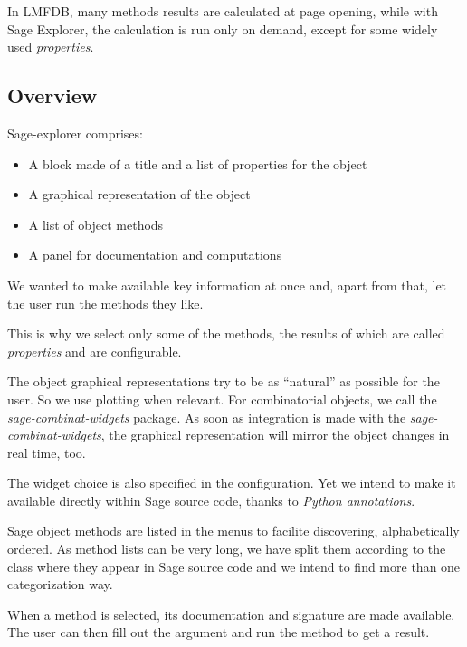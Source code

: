 \documentclass{deliverablereport}
\begin{document}

In LMFDB, many methods results are calculated at page opening, while
with Sage Explorer, the calculation is run only on demand, except for
some widely used \emph{properties}.


\subsection{Overview}

Sage-explorer comprises:

\begin{itemize}
  \item A block made of a title and a list of properties for the object
  \item A graphical representation of the object
  \item A list of object methods
  \item A panel for documentation and computations
\end{itemize}

We wanted to make available key information at once and, apart from
that, let the user run the methods they like.

This is why we select only some of the methods, the results of which
are called \emph{properties} and are configurable.


The object graphical representations try to be as ``natural'' as
possible for the user. So we use plotting when relevant. For
combinatorial objects, we call the \emph{sage-combinat-widgets}
package. As soon as integration is made with the \emph{sage-combinat-widgets},
the graphical representation will mirror the object changes in real
time, too.

The widget choice is also specified in the configuration. Yet we
intend to make it available directly within Sage source code, thanks
to \emph{Python annotations}.

Sage object methods are listed in the menus to facilite
discovering, alphabetically ordered. As method lists can be very long,
we have split them according to the class where they appear in Sage source
code and we intend to find more than one categorization way.

When a method is selected, its documentation and signature are made
available. The user can then fill out the argument and run the method
to get a result.
\end{document}
